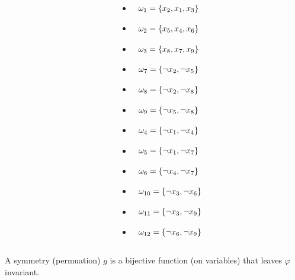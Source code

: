 \documentclass{beamer}
\begin{document}
\begin{frame}
\begin{columns}[t]
\begin{column}[T]{.3\textwidth}
\begin{itemize}
		\end{itemize}
		\end{column}
		\begin{column}[T]{.3\textwidth}
		\tiny
		\begin{itemize} 
		\item[] $\tikz[baseline]{\node[anchor=base] (b1){};} \omega_{1} = \{x_2  ,  x_1  ,  x_3\}$
		\item[] $\tikz[baseline]{\node[anchor=base] (b2){};} \omega_{2} = \{x_5  ,  x_4  ,  x_6\} $
		\item[] $\tikz[baseline]{\node[anchor=base] (b3){};} \omega_{3} = \{x_8  ,  x_7  ,  x_9\} $
		\item[] $\tikz[baseline]{\node[anchor=base] (b4){};} \omega_{7} = \{\neg x_2  ,  \neg x_5\} $
		\item[] $\tikz[baseline]{\node[anchor=base] (b5){};} \omega_{8} = \{\neg x_2  ,  \neg x_8\} $
		\item[] $\tikz[baseline]{\node[anchor=base] (b6){};} \omega_{9} = \{\neg x_5  ,  \neg x_8\} $
		\item[] $\tikz[baseline]{\node[anchor=base] (b7){};} \omega_{4} = \{\neg x_1  ,  \neg x_4\} $
		\item[] $\tikz[baseline]{\node[anchor=base] (b8){};} \omega_{5} = \{\neg x_1  ,  \neg x_7\} $
		\item[] $\tikz[baseline]{\node[anchor=base] (b9){};} \omega_{6} = \{\neg x_4  ,  \neg x_7\} $
		\item[] $\tikz[baseline]{\node[anchor=base] (b10){};} \omega_{10} = \{\neg x_3  ,  \neg x_6\} $
		\item[] $\tikz[baseline]{\node[anchor=base] (b11){};} \omega_{11} = \{\neg x_3  ,  \neg x_9\} $
		\item[] $\tikz[baseline]{\node[anchor=base] (b12){};} \omega_{12} = \{\neg x_6  ,  \neg x_9\} $
	\end{itemize}
	\end{column}
\end{columns}

\vfill
\normalsize
	A symmetry (permuation) $g$ is a bijective function (on variables) that leaves $\varphi$ invariant.
%	
	
	\vfill
\end{frame}
\end{document}
